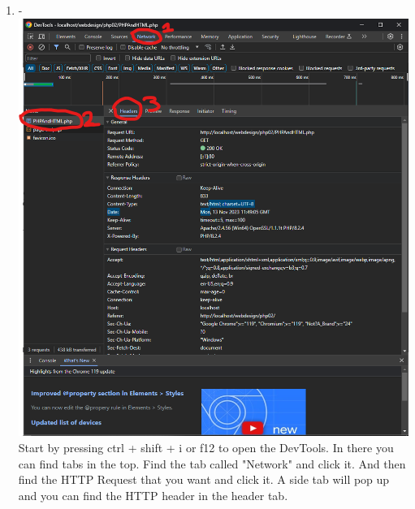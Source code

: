 \documentclass[12pt,titlepage]{article}
\begin{document}
\begin{enumerate}
    \item - \\ \includegraphics[width=.9\textwidth]{images/figures/fig19_a.png} \\ Start by pressing ctrl + shift + i or f12 to open the DevTools. In there you can find tabs in the top. Find the tab called "Network" and click it. And then find the HTTP Request that you want and click it. A side tab will pop up and you can find the HTTP header in the header tab.
    
    \newpage


\end{enumerate}
\end{document}
